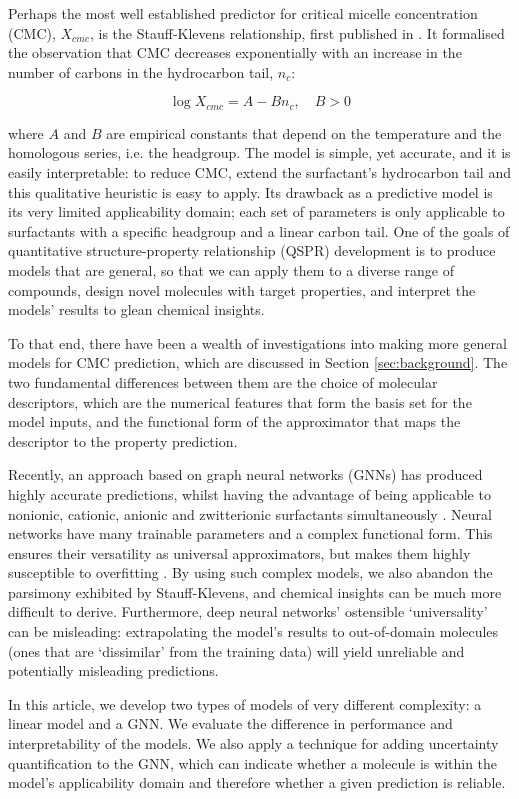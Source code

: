 Perhaps the most well established predictor for critical micelle concentration
(CMC), $X_{cmc}$, is the Stauff-Klevens relationship, first published in
\citeyear{klevensStructureAggregationDilate1953}
\cite{klevensStructureAggregationDilate1953}. It formalised the observation that
CMC decreases exponentially with an increase in the number of carbons in the
hydrocarbon tail, $n_c$:

\begin{equation}
    \label{eq:klevens}
    \log X_{cmc} = A - Bn_c, \quad B > 0
\end{equation}

where $A$ and $B$ are empirical constants that depend on the temperature and the
homologous series, i.e. the headgroup. The model is simple, yet accurate, and it
is easily interpretable: to reduce CMC, extend the surfactant's hydrocarbon tail
and this qualitative heuristic is easy to apply. Its drawback as a predictive
model is its very limited applicability domain; each set of parameters is only
applicable to surfactants with a specific headgroup and a linear carbon tail.
One of the goals of quantitative structure-property relationship (QSPR)
development is to produce models that are general, so that we can apply them to
a diverse range of compounds, design novel molecules with target properties, and
interpret the models' results to glean chemical insights.

To that end, there have been a wealth of investigations into making more general
models for CMC prediction, which are discussed in Section \ref{sec:background}.
The two fundamental differences between them are the choice of molecular
descriptors, which are the numerical features that form the basis set for the
model inputs, and the functional form of the approximator that maps the
descriptor to the property prediction. 

Recently, an approach based on graph neural networks (GNNs) has produced highly
accurate predictions, whilst having the advantage of being applicable to
nonionic, cationic, anionic and zwitterionic surfactants simultaneously
\cite{qinPredictingCriticalMicelle2021}. Neural networks have many
trainable parameters and a complex functional form. This ensures their
versatility as universal approximators, but makes them highly susceptible to
overfitting \cite{bejaniSystematicReviewOverfitting2021}. By using such complex
models, we also abandon the parsimony exhibited by Stauff-Klevens, and chemical
insights can be much more difficult to derive. Furthermore, deep neural
networks' ostensible `universality' can be misleading: extrapolating the model's
results to out-of-domain molecules (ones that are `dissimilar' from the training
data) will yield unreliable and potentially misleading predictions.

In this article, we develop two types of models of very different complexity: a
linear model and a GNN. We evaluate the difference in performance and
interpretability of the models. We also apply a technique for adding uncertainty
quantification to the GNN, which can indicate whether a molecule is within the
model's applicability domain and therefore whether a given prediction is
reliable.
